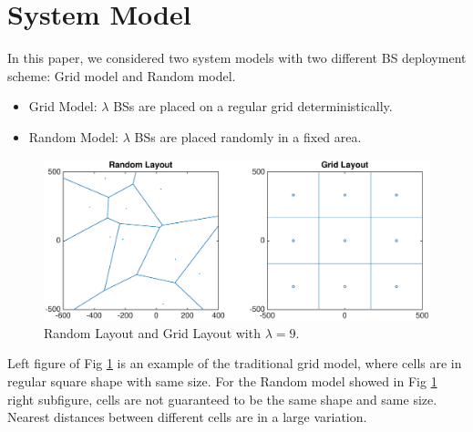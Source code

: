 \section{System Model}
\label{SystemModel}
In this paper, we considered two system models with two different BS deployment scheme: Grid model and Random model.
\begin{itemize}
\item Grid Model: $\lambda$ BSs are placed on a regular grid deterministically.
\item Random Model: $\lambda$ BSs are placed randomly in a fixed area.
\end{itemize}
\begin{figure}
\centering
\includegraphics[width=14cm]{systemLayout.eps}
\caption{Random Layout and Grid Layout with $\lambda = 9$.}
\label{RandomLayout}
\end{figure}
Left figure of Fig \ref{RandomLayout} is an example of the traditional grid model, where cells are in regular square shape with same size. For the Random model showed in Fig \ref{RandomLayout} right subfigure, cells are not guaranteed to be the same shape and same size. Nearest distances between different cells are in a large variation. 
